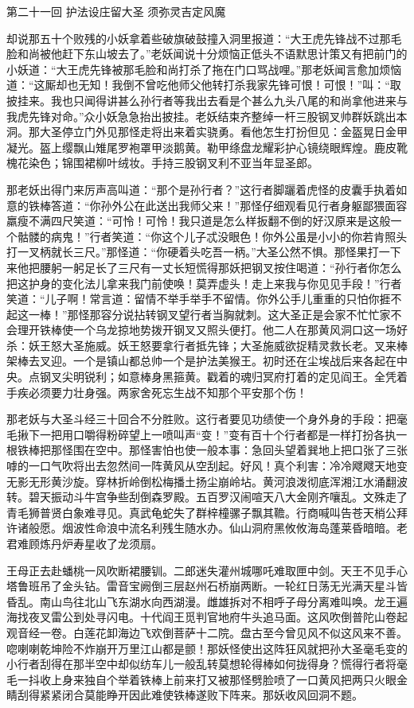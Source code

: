 \documentclass[12pt,UTF8]{ctexbook}
\begin{document}
{第二十一回 护法设庄留大圣 须弥灵吉定风魔

却说那五十个败残的小妖拿着些破旗破鼓撞入洞里报道：“大王虎先锋战不过那毛脸和尚被他赶下东山坡去了。”老妖闻说十分烦恼正低头不语默思计策又有把前门的小妖道：“大王虎先锋被那毛脸和尚打杀了拖在门口骂战哩。”那老妖闻言愈加烦恼道：“这厮却也无知！我倒不曾吃他师父他转打杀我家先锋可恨！可恨！”叫：“取披挂来。我也只闻得讲甚么孙行者等我出去看是个甚么九头八尾的和尚拿他进来与我虎先锋对命。”众小妖急急抬出披挂。老妖结束齐整绰一杆三股钢叉帅群妖跳出本洞。那大圣停立门外见那怪走将出来着实骁勇。看他怎生打扮但见：金盔晃日金甲凝光。盔上缨飘山雉尾罗袍罩甲淡鹅黄。勒甲绦盘龙耀彩护心镜绕眼辉煌。鹿皮靴槐花染色；锦围裙柳叶绒妆。手持三股钢叉利不亚当年显圣郎。

那老妖出得门来厉声高叫道：“那个是孙行者？”这行者脚躧着虎怪的皮囊手执着如意的铁棒答道：“你孙外公在此送出我师父来！”那怪仔细观看见行者身躯鄙猥面容羸瘦不满四尺笑道：“可怜！可怜！我只道是怎么样扳翻不倒的好汉原来是这般一个骷髅的病鬼！”行者笑道：“你这个儿子忒没眼色！你外公虽是小小的你若肯照头打一叉柄就长三尺。”那怪道：“你硬着头吃吾一柄。”大圣公然不惧。那怪果打一下来他把腰躬一躬足长了三尺有一丈长短慌得那妖把钢叉按住喝道：“孙行者你怎么把这护身的变化法儿拿来我门前使唤！莫弄虚头！走上来我与你见见手段！”行者笑道：“儿子啊！常言道：留情不举手举手不留情。你外公手儿重重的只怕你捱不起这一棒！”那怪那容分说拈转钢叉望行者当胸就刺。这大圣正是会家不忙忙家不会理开铁棒使一个乌龙掠地势拨开钢叉又照头便打。他二人在那黄风洞口这一场好杀：妖王怒大圣施威。妖王怒要拿行者抵先锋；大圣施威欲捉精灵救长老。叉来棒架棒去叉迎。一个是镇山都总帅一个是护法美猴王。初时还在尘埃战后来各起在中央。点钢叉尖明锐利；如意棒身黑箍黄。戳着的魂归冥府打着的定见阎王。全凭着手疾必须要力壮身强。两家舍死忘生战不知那个平安那个伤！

那老妖与大圣斗经三十回合不分胜败。这行者要见功绩使一个身外身的手段：把毫毛揪下一把用口嚼得粉碎望上一喷叫声“变！”变有百十个行者都是一样打扮各执一根铁棒把那怪围在空中。那怪害怕也使一般本事：急回头望着巽地上把口张了三张嘑的一口气吹将出去忽然间一阵黄风从空刮起。好风！真个利害：冷冷飕飕天地变无影无形黄沙旋。穿林折岭倒松梅播土扬尘崩岭坫。黄河浪泼彻底浑湘江水涌翻波转。碧天振动斗牛宫争些刮倒森罗殿。五百罗汉闹喧天八大金刚齐嚷乱。文殊走了青毛狮普贤白象难寻见。真武龟蛇失了群梓橦骡子飘其韂。行商喊叫告苍天梢公拜许诸般愿。烟波性命浪中流名利残生随水办。仙山洞府黑攸攸海岛蓬莱昏暗暗。老君难顾炼丹炉寿星收了龙须扇。

王母正去赴蟠桃一风吹断裙腰钏。二郎迷失灌州城哪吒难取匣中剑。天王不见手心塔鲁班吊了金头钻。雷音宝阙倒三层赵州石桥崩两断。一轮红日荡无光满天星斗皆昏乱。南山鸟往北山飞东湖水向西湖漫。雌雄拆对不相呼子母分离难叫唤。龙王遍海找夜叉雷公到处寻闪电。十代阎王觅判官地府牛头追马面。这风吹倒普陀山卷起观音经一卷。白莲花卸海边飞欢倒菩萨十二院。盘古至今曾见风不似这风来不善。唿喇喇乾坤险不炸崩开万里江山都是颤！那妖怪使出这阵狂风就把孙大圣毫毛变的小行者刮得在那半空中却似纺车儿一般乱转莫想轮得棒如何拢得身？慌得行者将毫毛一抖收上身来独自个举着铁棒上前来打又被那怪劈脸喷了一口黄风把两只火眼金睛刮得紧紧闭合莫能睁开因此难使铁棒遂败下阵来。那妖收风回洞不题。

}
\end{document}

